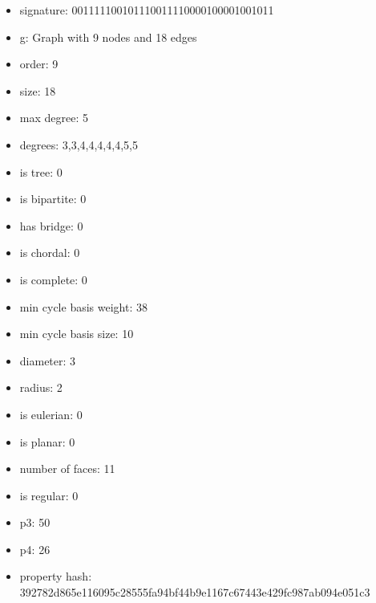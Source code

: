 \newpage
\begin{figure}
\end{figure}
\begin{itemize}
\item signature: 001111100101110011110000100001001011
\item g: Graph with 9 nodes and 18 edges
\item order: 9
\item size: 18
\item max degree: 5
\item degrees: 3,3,4,4,4,4,4,5,5
\item is tree: 0
\item is bipartite: 0
\item has bridge: 0
\item is chordal: 0
\item is complete: 0
\item min cycle basis weight: 38
\item min cycle basis size: 10
\item diameter: 3
\item radius: 2
\item is eulerian: 0
\item is planar: 0
\item number of faces: 11
\item is regular: 0
\item p3: 50
\item p4: 26
\item property hash: 392782d865e116095c28555fa94bf44b9e1167c67443e429fc987ab094e051c3
\end{itemize}
